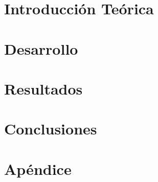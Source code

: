 \documentclass[11pt,a4paper]{article}
\begin{document}
\maketitle

\tableofcontents

\newpage

\section{Introducción Te\'orica}



\section{Desarrollo}



\section{Resultados}



\section{Conclusiones}



\newpage

\section{Apéndice}


\end{document}
